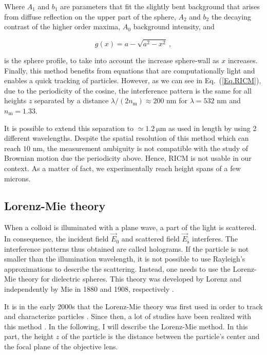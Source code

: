 Where $A_1$ and $b_1$ are parameters \cite{raedler_measurement_1992} that fit the slightly bent background that arises from diffuse reflection on the upper part of the sphere, $A_2$ and $b_2$ the decaying contrast of the higher order maxima, $A_0$ background intensity, and

\begin{equation}
	g(x) = a - \sqrt{a^2 - x^2} ~,
\end{equation}

is the sphere profile, to take into account the increase sphere-wall as $x$ increases.
Finally, this method benefits from equations that are computationally light and enables a quick tracking of particles. However, as we can see in Eq.~(\ref{Eq.RICM}), due to the periodicity of the cosine, the interference pattern is the same for all heights $z$ separated by a distance $\lambda / (2n_\mathrm{m}) \approx 200 $ nm for $\lambda = 532$ nm and $n_{\mathrm{m}} = 1.33$. 

It is possible to extend this separation to $\simeq 1.2 ~ \mathrm{\mu m}$ as used in \cite{davies_elastohydrodynamic_2018} length by using 2 different wavelengths. Despite the spatial resolution of this method which can reach $10$ nm, the measurement ambiguity is not compatible with the study of Brownian motion due the periodicity above. Hence, \gls{RICM} is not usable in our context. As a matter of fact, we experimentally reach height spans of a few microns. 



\subsection{Lorenz-Mie theory}
\label{chap:LM_fit}

When a colloid is illuminated with a plane wave, a part of the light is scattered. In consequence, the incident field $\vec{E}_0$ and scattered field $\vec{E}_\mathrm{s}$ interferes. The interference patterns thus obtained are called holograms. If the particle is not smaller than the illumination wavelength, it is not possible to use Rayleigh's approximations \cite{strutt_lviii_1871} to describe the scattering. Instead, one needs to use the Lorenz-Mie theory for dielectric spheres. This theory was developed by Lorenz and independently by Mie in 1880 and 1908, respectively \cite{lorenz_lysbevaegelsen_1890, mie_beitrage_1908}. 

It is in the early 2000s that the Lorenz-Mie theory was first used in order to track and characterize particles \cite{ovryn_imaging_2000, lee_characterizing_2007}. Since then, a lot of studies have been realized with this method \cite{katz_applications_2010}. In the following, I will describe the Lorenz-Mie method. In this part, the height $z$ of the particle is the distance between the particle's center and the focal plane of the objective lens.

